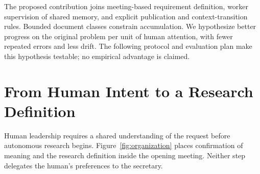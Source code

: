 \documentclass[11pt]{article}
\begin{document}
The proposed contribution joins meeting-based requirement definition, worker supervision of shared memory, and explicit publication and context-transition rules. Bounded document classes constrain accumulation. We hypothesize better progress on the original problem per unit of human attention, with fewer repeated errors and less drift. The following protocol and evaluation plan make this hypothesis testable; no empirical advantage is claimed.

\section{From Human Intent to a Research Definition}

Human leadership requires a shared understanding of the request before autonomous research begins. Figure~\ref{fig:organization} places confirmation of meaning and the research definition inside the opening meeting. Neither step delegates the human's preferences to the secretary.
\end{document}
